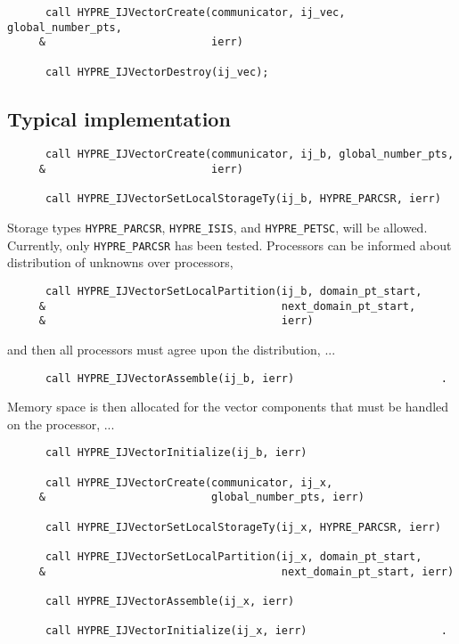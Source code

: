 \begin{verbatim}
      call HYPRE_IJVectorCreate(communicator, ij_vec, global_number_pts,
     &                          ierr)

      call HYPRE_IJVectorDestroy(ij_vec);
\end{verbatim}

\subsection{Typical implementation}

\begin{verbatim}
      call HYPRE_IJVectorCreate(communicator, ij_b, global_number_pts,
     &                          ierr)

      call HYPRE_IJVectorSetLocalStorageTy(ij_b, HYPRE_PARCSR, ierr)
\end{verbatim}

\noindent Storage types \verb+HYPRE_PARCSR+, \verb+HYPRE_ISIS+, and
\verb+HYPRE_PETSC+, will be allowed.  Currently, only \verb+HYPRE_PARCSR+
has been tested.  Processors can be informed about distribution of
unknowns over processors,

\begin{verbatim}
      call HYPRE_IJVectorSetLocalPartition(ij_b, domain_pt_start,
     &                                     next_domain_pt_start,
     &                                     ierr)
\end{verbatim}

\noindent and then all processors must agree upon the distribution, ...

\begin{verbatim}
      call HYPRE_IJVectorAssemble(ij_b, ierr)                       .
\end{verbatim}

\noindent Memory space is then allocated for the vector components
that must be handled on the processor, ...

\begin{verbatim}
      call HYPRE_IJVectorInitialize(ij_b, ierr)          

      call HYPRE_IJVectorCreate(communicator, ij_x,
     &                          global_number_pts, ierr)

      call HYPRE_IJVectorSetLocalStorageTy(ij_x, HYPRE_PARCSR, ierr)

      call HYPRE_IJVectorSetLocalPartition(ij_x, domain_pt_start,
     &                                     next_domain_pt_start, ierr)

      call HYPRE_IJVectorAssemble(ij_x, ierr)

      call HYPRE_IJVectorInitialize(ij_x, ierr)                     .
\end{verbatim}

